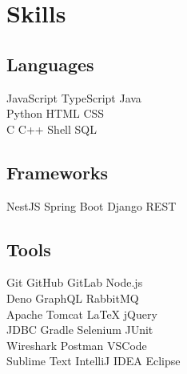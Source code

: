 \documentclass[]{deedy-resume-openfont}
\begin{document}
%
%
\lastupdated

%
%

%
%

\begin{minipage}[t]{0.33\textwidth} 


\section{Skills}
\subsection{Languages}
JavaScript \textbullet{} TypeScript \textbullet Java \\ 
\textbullet{} Python \textbullet{} HTML \textbullet{} CSS \\ 
\textbullet{} C \textbullet{} C++ \textbullet{} Shell \textbullet{} SQL \\

\subsection{Frameworks}
NestJS \textbullet{} Spring Boot \textbullet{} Django REST\\

\subsection{Tools}
Git \textbullet{} GitHub  \textbullet{} GitLab  \textbullet{} Node.js \\
\textbullet{} Deno \textbullet{} GraphQL \textbullet{} RabbitMQ\\
\textbullet{} Apache Tomcat \textbullet{} LaTeX \textbullet{} jQuery \\
\textbullet{} JDBC \textbullet{} Gradle \textbullet{} Selenium \textbullet{} JUnit  \\ 
\textbullet{} Wireshark \textbullet{} Postman \textbullet{} VSCode \\
\textbullet{} Sublime Text \textbullet{} IntelliJ IDEA \textbullet{} Eclipse 
\sectionsep


\end{minipage}
\end{document}
